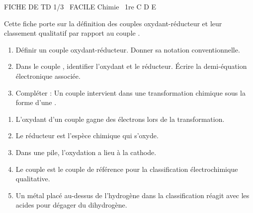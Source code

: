 \documentclass[11pt]{article}
\begin{document}
\begin{tcolorbox}[enhanced,colback=popink,colframe=popink,arc=10pt,boxrule=0pt,left=12pt,right=12pt,top=9pt,bottom=9pt]
{\color{white}\popxbold\small FICHE DE TD 1/3 \textbullet\ FACILE \hfill Chimie \textbullet\ 1re C D E\par}
\end{tcolorbox}
\vspace{4pt}
Cette fiche porte sur la définition des couples oxydant-réducteur et leur classement qualitatif par rapport au couple .

\begin{exercice}
\begin{enumerate}
    \item Définir un couple oxydant-réducteur. Donner sa notation conventionnelle.
    \item Dans le couple , identifier l'oxydant et le réducteur. Écrire la demi-équation électronique associée.
    \item Compléter : Un couple  intervient dans une transformation chimique sous la forme d'une \underline{\hspace{3cm}}.
\end{enumerate}
\end{exercice}

\begin{exercice}
\begin{enumerate}
    \item L'oxydant d'un couple gagne des électrons lors de la transformation.
    \item Le réducteur est l'espèce chimique qui s'oxyde.
    \item Dans une pile, l'oxydation a lieu à la cathode.
    \item Le couple  est le couple de référence pour la classification électrochimique qualitative.
    \item Un métal placé au-dessus de l'hydrogène dans la classification réagit avec les acides pour dégager du dihydrogène.
\end{enumerate}
\end{exercice}
\end{document}
